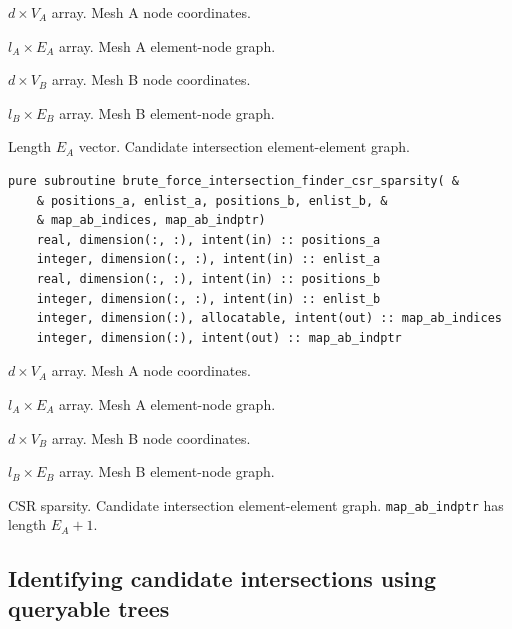 \documentclass{article}
\begin{document}
\begin{description}[font=\ttfamily\bfseries,leftmargin=2.2\parindent,labelindent=1.7\parindent,noitemsep]
  \item[positions\_a] $d \times V_A$ array. Mesh A node coordinates.
  \item[enlist\_a] $l_A \times E_A$ array. Mesh A element-node graph.
  \item[positions\_b] $d \times V_B$ array. Mesh B node coordinates.
  \item[enlist\_b] $l_B \times E_B$ array. Mesh B element-node graph.
  \item[map\_ab] Length $E_A$ vector. Candidate intersection element-element
    graph.
\end{description}

\begin{lstlisting}[language=FORTRAN]
  pure subroutine brute_force_intersection_finder_csr_sparsity( &
    & positions_a, enlist_a, positions_b, enlist_b, &
    & map_ab_indices, map_ab_indptr)
    real, dimension(:, :), intent(in) :: positions_a
    integer, dimension(:, :), intent(in) :: enlist_a
    real, dimension(:, :), intent(in) :: positions_b
    integer, dimension(:, :), intent(in) :: enlist_b
    integer, dimension(:), allocatable, intent(out) :: map_ab_indices
    integer, dimension(:), intent(out) :: map_ab_indptr
\end{lstlisting}

\begin{description}[font=\ttfamily\bfseries,leftmargin=2.2\parindent,labelindent=1.7\parindent,noitemsep]
  \item[positions\_a] $d \times V_A$ array. Mesh A node coordinates.
  \item[enlist\_a] $l_A \times E_A$ array. Mesh A element-node graph.
  \item[positions\_b] $d \times V_B$ array. Mesh B node coordinates.
  \item[enlist\_b] $l_B \times E_B$ array. Mesh B element-node graph.
  \item[map\_ab\_indices, map\_ab\_indptr] CSR sparsity. Candidate intersection
    element-element graph. \linebreak \verb+map_ab_indptr+ has length $E_A + 1$.
\end{description}

\subsection{Identifying candidate intersections using queryable trees}
\end{document}

